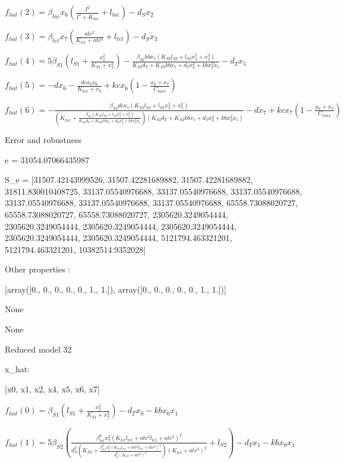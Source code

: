 $f_{hat}(2)=\beta_{lac} x_{6} \left(\frac{I^{2}}{I^{2} + K_{lac}} + l_{lac}\right) - d_{S} x_{2}$


$f_{hat}(3)=\beta_{tet} x_{7} \left(\frac{atc^{2}}{K_{tet} + atc^{2}} + l_{tet}\right) - d_{S} x_{3}$


$f_{hat}(4)=5 \beta_{S1} \left(l_{S1} + \frac{x_{2}^{2}}{K_{S1} + x_{2}^{2}}\right) - \frac{\beta_{S2} kb x_{5} \left(K_{S2} l_{S2} + l_{S2} x_{3}^{2} + x_{3}^{2}\right)}{K_{S2} d_{T} + K_{S2} kb x_{5} + d_{T} x_{3}^{2} + kb x_{3}^{2} x_{5}} - d_{T} x_{5}$


$f_{hat}(5)=- d x_{6} - \frac{dc x_{0} x_{6}}{K_{tox} + x_{0}} + kc x_{6} \left(1 - \frac{x_{6} + x_{7}}{C_{max}}\right)$


$f_{hat}(6)=- \frac{\beta_{S2} dc x_{7} \left(K_{S2} l_{S2} + l_{S2} x_{3}^{2} + x_{3}^{2}\right)}{\left(K_{tox} + \frac{\beta_{S2} \left(K_{S2} l_{S2} + l_{S2} x_{3}^{2} + x_{3}^{2}\right)}{K_{S2} d_{T} + K_{S2} kb x_{5} + d_{T} x_{3}^{2} + kb x_{3}^{2} x_{5}}\right) \left(K_{S2} d_{T} + K_{S2} kb x_{5} + d_{T} x_{3}^{2} + kb x_{3}^{2} x_{5}\right)} - d x_{7} + kc x_{7} \left(1 - \frac{x_{6} + x_{7}}{C_{max}}\right)$



Error and robustness 


e = 31054.07066435987

S_e = [31507.42143999526, 31507.42281689882, 31507.42281689882, 31811.830010408725, 33137.05540976688, 33137.05540976688, 33137.05540976688, 33137.05540976688, 33137.05540976688, 33137.05540976688, 65558.73088020727, 65558.73088020727, 65558.73088020727, 2305620.3249054444, 2305620.3249054444, 2305620.3249054444, 2305620.3249054444, 2305620.3249054444, 2305620.3249054444, 5121794.463321201, 5121794.463321201, 10382514.9352028]

Other properties :


[array([0., 0., 0., 0., 0., 1., 1.]), array([0., 0., 0., 0., 0., 1., 1.])]

None

None

Reduced model 32

x_{hat}: 

[x0, x1, x2, x4, x5, x6, x7]


$f_{hat}(0)=\beta_{S1} \left(l_{S1} + \frac{x_{2}^{2}}{K_{S1} + x_{2}^{2}}\right) - d_{T} x_{0} - kb x_{0} x_{1}$


$f_{hat}(1)=5 \beta_{S2} \left(\frac{\beta_{tet}^{2} x_{7}^{2} \left(K_{tet} l_{tet} + atc^{2} l_{tet} + atc^{2}\right)^{2}}{d_{S}^{2} \left(K_{S2} + \frac{\beta_{tet}^{2} x_{7}^{2} \left(K_{tet} l_{tet} + atc^{2} l_{tet} + atc^{2}\right)^{2}}{d_{S}^{2} \left(K_{tet} + atc^{2}\right)^{2}}\right) \left(K_{tet} + atc^{2}\right)^{2}} + l_{S2}\right) - d_{T} x_{1} - kb x_{0} x_{1}$


